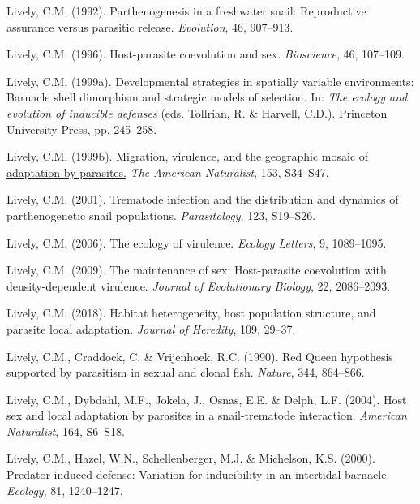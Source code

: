 \documentclass[
  letterpaper,
]{book}
\newlength{\cslhangindent}
\newenvironment{CSLReferences}[2] %
 {\begin{list}{}{%
  \setlength{\itemindent}{0pt}
  \setlength{\leftmargin}{0pt}
  \setlength{\parsep}{0pt}
  \ifodd #1
   \setlength{\leftmargin}{\cslhangindent}
   \setlength{\itemindent}{-1\cslhangindent}
  \fi
  \setlength{\itemsep}{#2\baselineskip}}}
 {\end{list}}
\begin{document}
\begin{CSLReferences}{1}{0}
Lively, C.M. (1992). Parthenogenesis in a freshwater snail: Reproductive
assurance versus parasitic release. \emph{Evolution}, 46, 907--913.

Lively, C.M. (1996). Host-parasite coevolution and sex.
\emph{Bioscience}, 46, 107--109.

Lively, C.M. (1999a). Developmental strategies in spatially variable
environments: Barnacle shell dimorphism and strategic models of
selection. In: \emph{The ecology and evolution of inducible defenses}
(eds. Tollrian, R. \& Harvell, C.D.). Princeton University Press, pp.
245--258.

Lively, C.M. (1999b). \href{https://doi.org/10.1086/303210}{Migration,
virulence, and the geographic mosaic of adaptation by parasites.}
\emph{The American Naturalist}, 153, S34--S47.

Lively, C.M. (2001). Trematode infection and the distribution and
dynamics of parthenogenetic snail populations. \emph{Parasitology}, 123,
S19--S26.

Lively, C.M. (2006). The ecology of virulence. \emph{Ecology Letters},
9, 1089--1095.

Lively, C.M. (2009). The maintenance of sex: Host-parasite coevolution
with density-dependent virulence. \emph{Journal of Evolutionary
Biology}, 22, 2086--2093.

Lively, C.M. (2018). Habitat heterogeneity, host population structure,
and parasite local adaptation. \emph{Journal of Heredity}, 109, 29--37.

Lively, C.M., Craddock, C. \& Vrijenhoek, R.C. (1990). {Red Queen}
hypothesis supported by parasitism in sexual and clonal fish.
\emph{Nature}, 344, 864--866.

Lively, C.M., Dybdahl, M.F., Jokela, J., Osnas, E.E. \& Delph, L.F.
(2004). Host sex and local adaptation by parasites in a snail-trematode
interaction. \emph{American Naturalist}, 164, S6--S18.

Lively, C.M., Hazel, W.N., Schellenberger, M.J. \& Michelson, K.S.
(2000). Predator-induced defense: Variation for inducibility in an
intertidal barnacle. \emph{Ecology}, 81, 1240--1247.


\end{CSLReferences}
\end{document}
